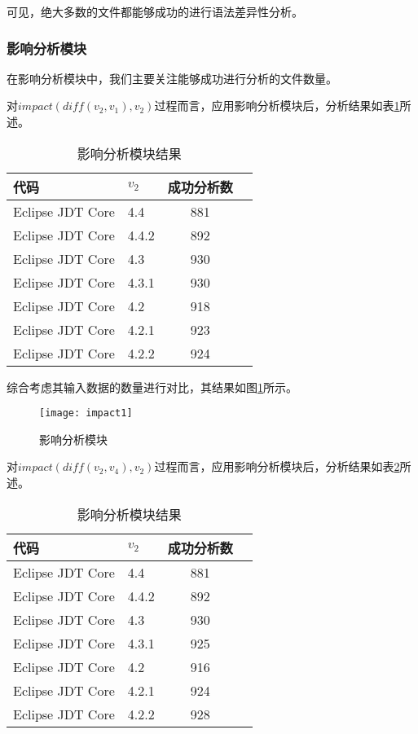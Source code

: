 可见，绝大多数的文件都能够成功的进行语法差异性分析。


\subsubsection{影响分析模块}

在影响分析模块中，我们主要关注能够成功进行分析的文件数量。

对$impact(diff(v_2,v_1),v_2)$过程而言，应用影响分析模块后，分析结果如表\ref {data_impact_1}所述。

\begin{table}[H]
	\caption{影响分析模块结果}
	\label{data_impact_1}
	\centering
	\begin{tabular}{llcc}
		\toprule[1.5pt]
		{\heiti 代码} & {\heiti $v_2$} & {\heiti 成功分析数}  \\\midrule[1pt]
		Eclipse JDT Core & 4.4	 & 881	\\
		Eclipse JDT Core & 4.4.2 & 892 	\\
		Eclipse JDT Core & 4.3	 & 930		\\
		Eclipse JDT Core & 4.3.1 & 930 	\\
		Eclipse JDT Core & 4.2 	 &	918		\\
		Eclipse JDT Core & 4.2.1 & 923	\\
		Eclipse JDT Core & 4.2.2  & 924		\\
		\bottomrule[1.5pt]
	\end{tabular}
\end{table}

综合考虑其输入数据的数量进行对比，其结果如图\ref {impact1}所示。

\begin{figure}[H]
	\centering
	\texttt{[image: impact1]}
	\caption {影响分析模块}
	\label {impact1}	
\end{figure}

对$impact(diff(v_2,v_4),v_2)$过程而言，应用影响分析模块后，分析结果如表\ref {data_impact_2}所述。

\begin{table}[H]
	\caption{影响分析模块结果}
	\label{data_impact_2}
	\centering
	\begin{tabular}{llcc}
		\toprule[1.5pt]
		{\heiti 代码} & {\heiti $v_2$} & {\heiti 成功分析数}  \\\midrule[1pt]
		Eclipse JDT Core & 4.4	 & 881	\\
		Eclipse JDT Core & 4.4.2 & 892	 	\\
		Eclipse JDT Core & 4.3	 & 930			\\
		Eclipse JDT Core & 4.3.1 & 925	 	\\
		Eclipse JDT Core & 4.2 	 & 916			\\
		Eclipse JDT Core & 4.2.1 	 & 924		\\
		Eclipse JDT Core & 4.2.2 	 & 928		\\
		\bottomrule[1.5pt]
	\end{tabular}
\end{table}

